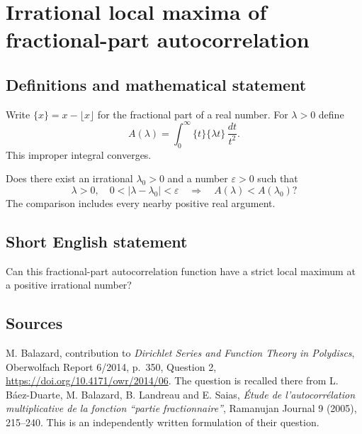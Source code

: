 \documentclass{article}
\begin{document}
\section*{Irrational local maxima of fractional-part autocorrelation}
\subsection{Definitions and mathematical statement}
Write $\{x\}=x-\lfloor x\rfloor$ for the fractional part of a real number.
For $\lambda>0$ define
\[
 A(\lambda)=\int_0^\infty\{t\}\{\lambda t\}\,\frac{dt}{t^2}.
\]
This improper integral converges.

Does there exist an irrational $\lambda_0>0$ and a number $\varepsilon>0$
such that
\[
 \lambda>0,\quad 0<|\lambda-\lambda_0|<\varepsilon
 \quad\Longrightarrow\quad A(\lambda)<A(\lambda_0)?
\]
The comparison includes every nearby positive real argument.

\subsection{Short English statement}
Can this fractional-part autocorrelation function have a strict local maximum
at a positive irrational number?

\subsection{Sources}
M. Balazard, contribution to \emph{Dirichlet Series and Function Theory in
Polydiscs}, Oberwolfach Report 6/2014, p.\ 350, Question 2,
\url{https://doi.org/10.4171/owr/2014/06}.
The question is recalled there from L. B\'aez-Duarte, M. Balazard,
B. Landreau and E. Saias, \emph{\'Etude de l'autocorr\'elation multiplicative
de la fonction ``partie fractionnaire''}, Ramanujan Journal 9 (2005),
215--240. This is an independently written formulation of their question.
\end{document}

